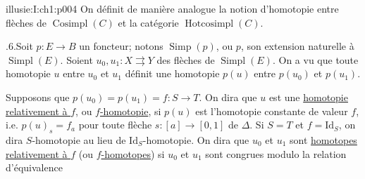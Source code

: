 \begin{illusiebodypage}{illusie:I:ch1:p004}
\hypertarget{illusie:I:ch1:s1:1:p12}{}%
On définit de manière analogue la notion d'homotopie entre flèches de
$\operatorname{Cosimpl}(C)$ et la catégorie $\operatorname{Hotcosimpl}(C)$.

\hypertarget{illusie:I:ch1:s1:1:p13}{}%
.6.\quad Soit $p:E\longrightarrow B$ un foncteur; notons
$\operatorname{Simp}(p)$, ou $p$, son extension naturelle à
$\operatorname{Simpl}(E)$. Soient $u_0,u_1:X\rightrightarrows Y$ des flèches
de $\operatorname{Simpl}(E)$. On a vu que toute homotopie $u$ entre $u_0$ et
$u_1$ définit une homotopie $p(u)$ entre $p(u_0)$ et $p(u_1)$.

\hypertarget{illusie:I:ch1:s1:1:p14}{}%
Supposons que $p(u_0)=p(u_1)=f:S\longrightarrow T$. On dira que $u$ est une
\underline{homotopie relativement à $f$}, ou \underline{$f$-homotopie}, si
$p(u)$ est l'homotopie \textquotedbl constante de valeur $f$\textquotedbl,
i.e. $p(u)_s=f_a$ pour toute flèche $s:[a]\longrightarrow[0,1]$ de $\Delta$.
Si $S=T$ et $f=\mathrm{Id}_S$, on dira \textquotedbl$S$-homotopie\textquotedbl
au lieu de \textquotedbl$\mathrm{Id}_S$-homotopie\textquotedbl. On dira que
$u_0$ et $u_1$ sont \underline{homotopes relativement à $f$} (ou
\underline{$f$-homotopes}) si $u_0$ et $u_1$ sont congrues modulo la relation
d'équivalence
\end{illusiebodypage}
